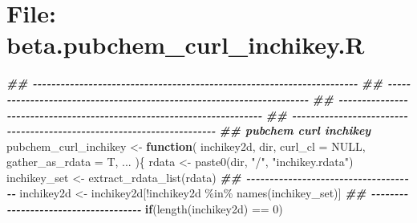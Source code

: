 \documentclass[
]{article}
\newenvironment{Shaded}{\begin{snugshade}}{\end{snugshade}}
\newcommand{\AttributeTok}[1]{\textcolor[rgb]{0.77,0.63,0.00}{#1}}
\newcommand{\ConstantTok}[1]{\textcolor[rgb]{0.00,0.00,0.00}{#1}}
\newcommand{\ControlFlowTok}[1]{\textcolor[rgb]{0.13,0.29,0.53}{\textbf{#1}}}
\newcommand{\DecValTok}[1]{\textcolor[rgb]{0.00,0.00,0.81}{#1}}
\newcommand{\DocumentationTok}[1]{\textcolor[rgb]{0.56,0.35,0.01}{\textbf{\textit{#1}}}}
\newcommand{\FunctionTok}[1]{\textcolor[rgb]{0.00,0.00,0.00}{#1}}
\newcommand{\NormalTok}[1]{#1}
\newcommand{\OtherTok}[1]{\textcolor[rgb]{0.56,0.35,0.01}{#1}}
\newcommand{\SpecialCharTok}[1]{\textcolor[rgb]{0.00,0.00,0.00}{#1}}
\newcommand{\StringTok}[1]{\textcolor[rgb]{0.31,0.60,0.02}{#1}}
\begin{document}
\hypertarget{file-beta.pubchem_curl_inchikey.r}{%
\section{File: beta.pubchem\_curl\_inchikey.R}\label{file-beta.pubchem_curl_inchikey.r}}

\begin{Shaded}
\begin{Highlighting}[]
\DocumentationTok{\#\# {-}{-}{-}{-}{-}{-}{-}{-}{-}{-}{-}{-}{-}{-}{-}{-}{-}{-}{-}{-}{-}{-}{-}{-}{-}{-}{-}{-}{-}{-}{-}{-}{-}{-}{-}{-}{-}{-}{-}{-}{-}{-}{-}{-}{-}{-}{-}{-}{-}{-}{-}{-}{-}{-}{-}{-}{-}{-}{-}{-}{-}{-}{-}{-}{-}{-}{-}{-}{-}{-} }
\DocumentationTok{\#\# {-}{-}{-}{-}{-}{-}{-}{-}{-}{-}{-}{-}{-}{-}{-}{-}{-}{-}{-}{-}{-}{-}{-}{-}{-}{-}{-}{-}{-}{-}{-}{-}{-}{-}{-}{-}{-}{-}{-}{-}{-}{-}{-}{-}{-}{-}{-}{-}{-}{-}{-}{-}{-}{-}{-}{-}{-}{-}{-}{-}{-}{-}{-}{-}{-}{-}{-}{-}{-}{-} }
\DocumentationTok{\#\# {-}{-}{-}{-}{-}{-}{-}{-}{-}{-}{-}{-}{-}{-}{-}{-}{-}{-}{-}{-}{-}{-}{-}{-}{-}{-}{-}{-}{-}{-}{-}{-}{-}{-}{-}{-}{-}{-}{-}{-}{-}{-}{-}{-}{-}{-}{-}{-}{-}{-}{-}{-}{-}{-}{-}{-}{-}{-}{-}{-}{-}{-}{-}{-}{-}{-}{-}{-}{-}{-} }
\DocumentationTok{\#\# {-}{-}{-}{-}{-}{-}{-}{-}{-}{-}{-}{-}{-}{-}{-}{-}{-}{-}{-}{-}{-}{-}{-}{-}{-}{-}{-}{-}{-}{-}{-}{-}{-}{-}{-}{-}{-}{-}{-}{-}{-}{-}{-}{-}{-}{-}{-}{-}{-}{-}{-}{-}{-}{-}{-}{-}{-}{-}{-}{-}{-}{-}{-}{-}{-}{-}{-}{-}{-}{-} }
\DocumentationTok{\#\# pubchem curl inchikey}
\NormalTok{pubchem\_curl\_inchikey }\OtherTok{\textless{}{-}} 
  \ControlFlowTok{function}\NormalTok{(}
\NormalTok{           inchikey2d,}
\NormalTok{           dir,}
           \AttributeTok{curl\_cl =} \ConstantTok{NULL}\NormalTok{,}
           \AttributeTok{gather\_as\_rdata =}\NormalTok{ T,}
\NormalTok{           ...}
\NormalTok{           )\{}
\NormalTok{    rdata }\OtherTok{\textless{}{-}} \FunctionTok{paste0}\NormalTok{(dir, }\StringTok{"/"}\NormalTok{, }\StringTok{"inchikey.rdata"}\NormalTok{)}
\NormalTok{    inchikey\_set }\OtherTok{\textless{}{-}} \FunctionTok{extract\_rdata\_list}\NormalTok{(rdata)}
    \DocumentationTok{\#\# {-}{-}{-}{-}{-}{-}{-}{-}{-}{-}{-}{-}{-}{-}{-}{-}{-}{-}{-}{-}{-}{-}{-}{-}{-}{-}{-}{-}{-}{-}{-}{-}{-}{-}{-}{-}{-}}
\NormalTok{    inchikey2d }\OtherTok{\textless{}{-}}\NormalTok{ inchikey2d[}\SpecialCharTok{!}\NormalTok{inchikey2d }\SpecialCharTok{\%in\%} \FunctionTok{names}\NormalTok{(inchikey\_set)]}
    \DocumentationTok{\#\# {-}{-}{-}{-}{-}{-}{-}{-}{-}{-}{-}{-}{-}{-}{-}{-}{-}{-}{-}{-}{-}{-}{-}{-}{-}{-}{-}{-}{-}{-}{-}{-}{-}{-}{-}{-}{-} }
    \ControlFlowTok{if}\NormalTok{(}\FunctionTok{length}\NormalTok{(inchikey2d) }\SpecialCharTok{==} \DecValTok{0}\NormalTok{)}

\end{Highlighting}
\end{Shaded}
\end{document}
